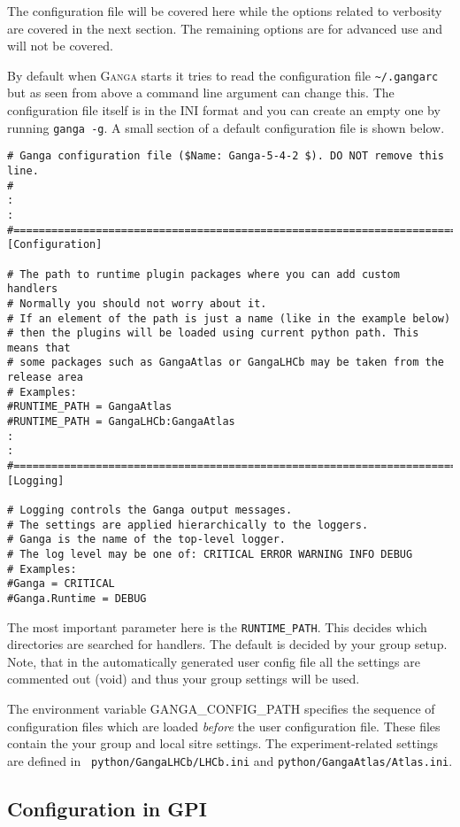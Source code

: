 \documentclass{howto}
\def\ganga {\textsc{Ganga}\xspace}
\begin{document}
The configuration file will be covered here while the options related to
verbosity are covered in the next section. The remaining options are for
advanced use and will not be covered.

By default when \ganga starts  it tries to read the configuration file
\texttt{\~{}/.gangarc} but  as seen from  above a command  line argument
can change  this. The configuration file  itself is in  the INI format
and you can create an empty  one by running \texttt{ganga -g}. A small
section of a default configuration file is shown below.

\begin{verbatim}
# Ganga configuration file ($Name: Ganga-5-4-2 $). DO NOT remove this line.
#
:
:
#=======================================================================
[Configuration]

# The path to runtime plugin packages where you can add custom handlers
# Normally you should not worry about it.
# If an element of the path is just a name (like in the example below)
# then the plugins will be loaded using current python path. This means that
# some packages such as GangaAtlas or GangaLHCb may be taken from the release area
# Examples:
#RUNTIME_PATH = GangaAtlas
#RUNTIME_PATH = GangaLHCb:GangaAtlas
:
:
#=======================================================================
[Logging]

# Logging controls the Ganga output messages.
# The settings are applied hierarchically to the loggers.
# Ganga is the name of the top-level logger.
# The log level may be one of: CRITICAL ERROR WARNING INFO DEBUG
# Examples:
#Ganga = CRITICAL
#Ganga.Runtime = DEBUG
\end{verbatim}

The most  important parameter here is  the \texttt{RUNTIME_PATH}. This
decides which  directories are searched  for handlers. The  default is
decided by your group setup. Note, that in the automatically generated
user config  file all the settings  are commented out  (void) and thus
your group settings will be used. 

The environment  variable GANGA_CONFIG_PATH specifies  the sequence of
configuration   files  which   are  loaded   {\it  before}   the  user
configuration  file.  These  files contain  the your  group  and local
sitre settings.   The experiment-related settings are  defined in {\tt
python/GangaLHCb/LHCb.ini} and {\tt python/GangaAtlas/Atlas.ini}.

\subsection{Configuration in GPI}
\end{document}
